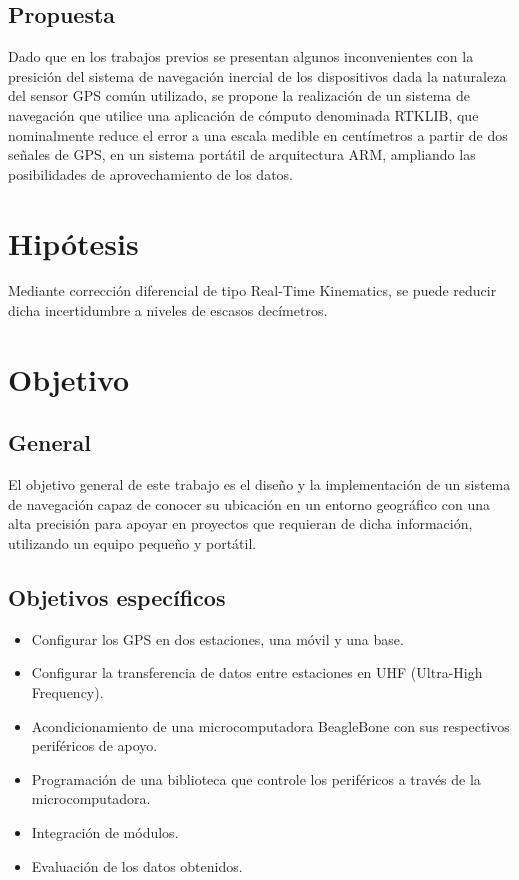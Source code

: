 \subsection{Propuesta}
Dado que en los trabajos previos se presentan algunos inconvenientes con la presición del sistema de navegación inercial de los dispositivos dada la naturaleza del sensor GPS común utilizado, se propone la realización de un sistema de navegación que utilice una aplicación de cómputo denominada RTKLIB, que nominalmente reduce el error a una escala medible en centímetros a partir de dos señales de GPS, en un sistema portátil de arquitectura ARM, ampliando las posibilidades de aprovechamiento de los datos.

\section{Hipótesis}
Mediante corrección diferencial de tipo Real-Time Kinematics, se puede reducir dicha incertidumbre a niveles de escasos decímetros.

\section{Objetivo}
\subsection{General}
El objetivo general de este trabajo es el diseño y la implementación de un sistema de navegación capaz de conocer su ubicación en un entorno geográfico con una alta precisión para apoyar en proyectos que requieran de dicha información, utilizando un equipo pequeño y portátil.

\subsection{Objetivos específicos}
\begin{itemize}
	\item Configurar los GPS en dos estaciones, una móvil y una base.
    \item Configurar la transferencia de datos entre estaciones en UHF (Ultra-High Frequency\footnotemark).
    \item Acondicionamiento de una microcomputadora BeagleBone con sus respectivos periféricos de apoyo.
    \item Programación de una biblioteca que controle los periféricos a través de la microcomputadora.
    \item Integración de módulos.
	\item Evaluación de los datos obtenidos.   
\end{itemize}

